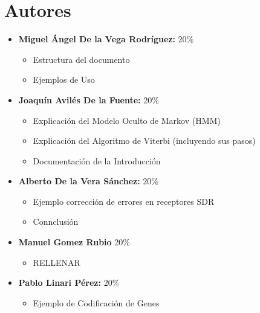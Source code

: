 \documentclass[11pt,openany]{book}
\begin{document}
\tableofcontents %
\newpage %


\chapter{Autores}
\begin{itemize}
      \item \textbf{Miguel Ángel De la Vega Rodríguez:} 20\%
            \begin{itemize}
                  \item Estructura del documento
                  \item Ejemplos de Uso
            \end{itemize}
      \item \textbf{Joaquín Avilés De la Fuente:} 20\%
            \begin{itemize}
                  \item Explicación del Modelo Oculto de Markov (HMM)
                  \item Explicación del Algoritmo de Viterbi (incluyendo sus pasos)
                  \item Documentación de la Introducción
            \end{itemize}
      \item \textbf{Alberto De la Vera Sánchez: } 20\%
            \begin{itemize}
                  \item Ejemplo corrección de errores en receptores SDR
                  \item Connclusión
            \end{itemize}
      \item \textbf{Manuel Gomez Rubio} 20\%
            \begin{itemize}
                \item RELLENAR
            \end{itemize}
      \item \textbf{Pablo Linari Pérez:} 20\%
            \begin{itemize}
                  \item Ejemplo de Codificación de Genes
            \end{itemize}
\end{itemize}
\end{document}
